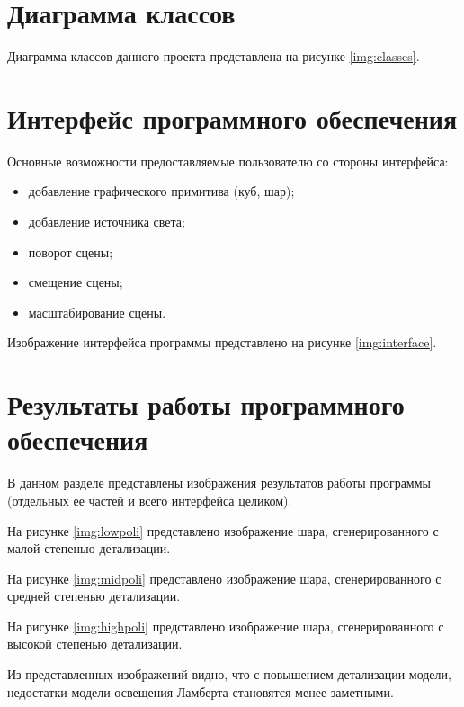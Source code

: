 \section{Диаграмма классов}

Диаграмма классов данного проекта представлена на рисунке  \ref{img:classes}.


\section{Интерфейс программного обеспечения}

Основные возможности предоставляемые пользователю со стороны интерфейса:

\begin{itemize}
	\item добавление графического примитива (куб, шар);
	\item добавление источника света;
	\item поворот сцены;
	\item смещение сцены;
	\item масштабирование сцены.
\end{itemize}

Изображение интерфейса программы представлено на рисунке \ref{img:interface}.


\newpage
\section{Результаты работы программного обеспечения}

В данном разделе представлены изображения результатов работы программы (отдельных ее частей и всего интерфейса целиком).

На рисунке \ref{img:lowpoli} представлено изображение шара, сгенерированного с малой степенью детализации. 

\newpage
На рисунке \ref{img:midpoli} представлено изображение шара, сгенерированного с средней степенью детализации. 

На рисунке \ref{img:highpoli} представлено изображение шара, сгенерированного с высокой степенью детализации. 

Из представленных изображений видно, что с повышением детализации модели, недостатки модели освещения Ламберта становятся менее заметными.

